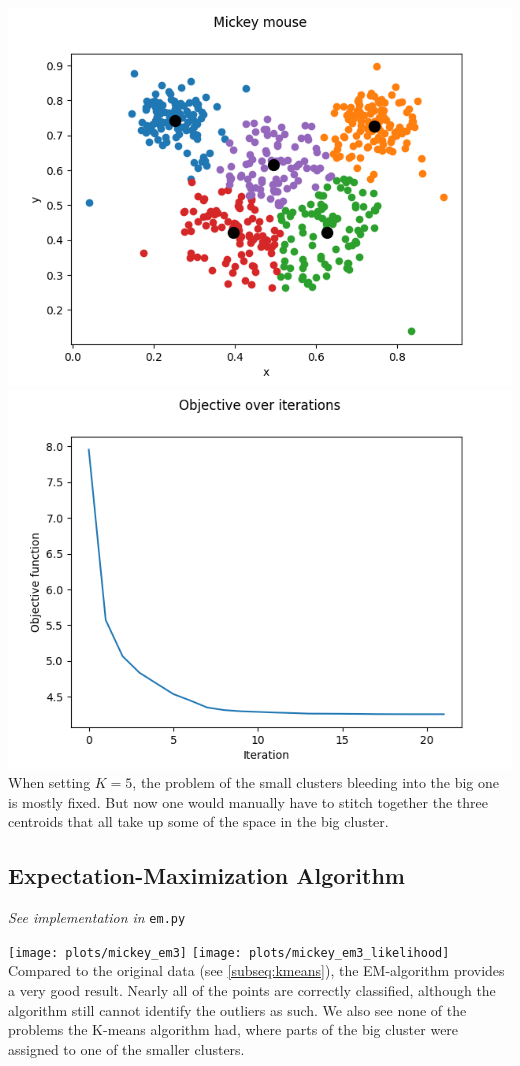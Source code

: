     \includegraphics[width=\textwidth / 2]{plots/mickey_k5}
    \includegraphics[width=\textwidth / 2]{plots/mickey_k5_loss}
    When setting $K=5$, the problem of the small clusters bleeding into the big one is mostly fixed.
    But now one would manually have to stitch together the three centroids that all take up some of the space in the big cluster.

    \subsection{Expectation-Maximization Algorithm}
    \textit{See implementation in} \texttt{em.py}

    \texttt{[image: plots/mickey\_em3]}
    \texttt{[image: plots/mickey\_em3\_likelihood]}
    Compared to the original data (see \ref{subseq:kmeans}), the EM-algorithm provides a very good result.
    Nearly all of the points are correctly classified, although the algorithm still cannot identify the outliers as such.
    We also see none of the problems the K-means algorithm had, where parts of the big cluster were assigned to one of the smaller clusters.

